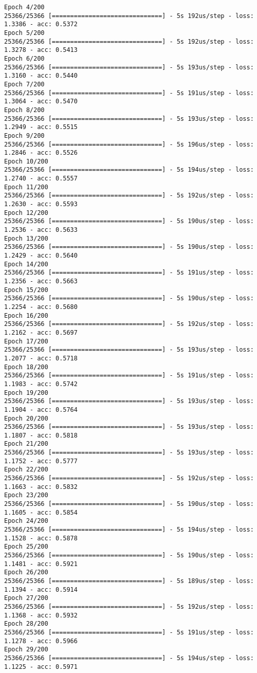 \documentclass[11pt]{article}
\begin{document}
\begin{Verbatim}[commandchars=\\\{\}]
Epoch 4/200
25366/25366 [==============================] - 5s 192us/step - loss: 1.3386 - acc: 0.5372
Epoch 5/200
25366/25366 [==============================] - 5s 192us/step - loss: 1.3278 - acc: 0.5413
Epoch 6/200
25366/25366 [==============================] - 5s 193us/step - loss: 1.3160 - acc: 0.5440
Epoch 7/200
25366/25366 [==============================] - 5s 191us/step - loss: 1.3064 - acc: 0.5470
Epoch 8/200
25366/25366 [==============================] - 5s 193us/step - loss: 1.2949 - acc: 0.5515
Epoch 9/200
25366/25366 [==============================] - 5s 196us/step - loss: 1.2846 - acc: 0.5526
Epoch 10/200
25366/25366 [==============================] - 5s 194us/step - loss: 1.2740 - acc: 0.5557
Epoch 11/200
25366/25366 [==============================] - 5s 192us/step - loss: 1.2630 - acc: 0.5593
Epoch 12/200
25366/25366 [==============================] - 5s 190us/step - loss: 1.2536 - acc: 0.5633
Epoch 13/200
25366/25366 [==============================] - 5s 190us/step - loss: 1.2429 - acc: 0.5640
Epoch 14/200
25366/25366 [==============================] - 5s 191us/step - loss: 1.2356 - acc: 0.5663
Epoch 15/200
25366/25366 [==============================] - 5s 190us/step - loss: 1.2254 - acc: 0.5680
Epoch 16/200
25366/25366 [==============================] - 5s 192us/step - loss: 1.2162 - acc: 0.5697
Epoch 17/200
25366/25366 [==============================] - 5s 193us/step - loss: 1.2077 - acc: 0.5718
Epoch 18/200
25366/25366 [==============================] - 5s 191us/step - loss: 1.1983 - acc: 0.5742
Epoch 19/200
25366/25366 [==============================] - 5s 193us/step - loss: 1.1904 - acc: 0.5764
Epoch 20/200
25366/25366 [==============================] - 5s 193us/step - loss: 1.1807 - acc: 0.5818
Epoch 21/200
25366/25366 [==============================] - 5s 193us/step - loss: 1.1752 - acc: 0.5777
Epoch 22/200
25366/25366 [==============================] - 5s 192us/step - loss: 1.1663 - acc: 0.5832
Epoch 23/200
25366/25366 [==============================] - 5s 190us/step - loss: 1.1605 - acc: 0.5854
Epoch 24/200
25366/25366 [==============================] - 5s 194us/step - loss: 1.1528 - acc: 0.5878
Epoch 25/200
25366/25366 [==============================] - 5s 190us/step - loss: 1.1481 - acc: 0.5921
Epoch 26/200
25366/25366 [==============================] - 5s 189us/step - loss: 1.1394 - acc: 0.5914
Epoch 27/200
25366/25366 [==============================] - 5s 192us/step - loss: 1.1368 - acc: 0.5932
Epoch 28/200
25366/25366 [==============================] - 5s 191us/step - loss: 1.1278 - acc: 0.5966
Epoch 29/200
25366/25366 [==============================] - 5s 194us/step - loss: 1.1225 - acc: 0.5971

\end{Verbatim}
\end{document}
